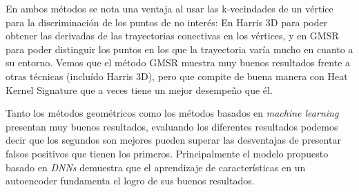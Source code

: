 \documentclass[conference]{IEEEtran}
\begin{document}
En ambos métodos se nota una ventaja al usar las k-vecindades de un vértice para la discriminación de los puntos de no interés: En Harris 3D para poder obtener las derivadas de las trayectorias conectivas en los vértices, y en GMSR para poder distinguir los puntos en los que la trayectoria varía mucho en cuanto a su entorno. Vemos que el método GMSR muestra muy buenos resultados frente a otras técnicas (incluído Harris 3D), pero que compite de buena manera con Heat Kernel Signature que a veces tiene un mejor desempeño que él.

Tanto los métodos geométricos como los métodos basados en \textit{machine learning} presentan muy buenos resultados, evaluando los diferentes resultados podemos decir que los segundos son mejores pueden superar las desventajas de presentar falsos positivos que tienen los primeros. Principalmente el modelo propuesto basado en \textit{DNNs} demuestra que el aprendizaje de características en un autoencoder fundamenta el logro de sus buenos resultados.











\end{document}
